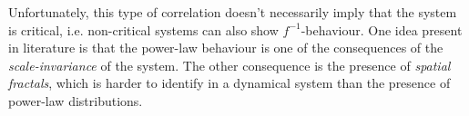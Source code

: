 Unfortunately, this type of correlation doesn't necessarily imply that the system is critical, i.e. non-critical systems can also show $f^{-1}$-behaviour. One idea present in literature is that the power-law behaviour is one of the consequences of the \emph{scale-invariance} of the system. The other consequence is the presence of \emph{spatial fractals}, which is harder to identify in a dynamical system than the presence of power-law distributions.
